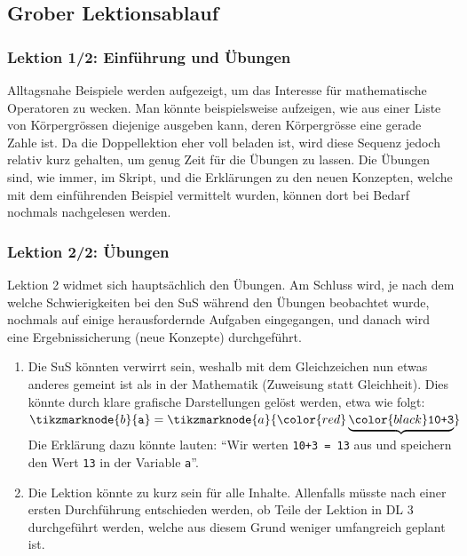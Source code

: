 \begin{myExBox}[title=DL \themycounter]
\subsection*{Grober Lektionsablauf}
\subsubsection*{Lektion 1/2: Einführung und Übungen}
Alltagsnahe Beispiele werden aufgezeigt, um das Interesse für mathematische Operatoren zu wecken. Man könnte beispielsweise aufzeigen, wie aus einer Liste von Körpergrössen diejenige ausgeben kann, deren Körpergrösse eine gerade Zahle ist. Da die Doppellektion eher voll beladen ist, wird diese Sequenz jedoch relativ kurz gehalten, um genug Zeit für die Übungen zu lassen. Die Übungen sind, wie immer, im Skript, und die Erklärungen zu den neuen Konzepten, welche mit dem einführenden Beispiel vermittelt wurden, können dort bei Bedarf nochmals nachgelesen werden.

\subsubsection*{Lektion 2/2: Übungen}
Lektion 2 widmet sich hauptsächlich den Übungen. Am Schluss wird, je nach dem welche Schwierigkeiten bei den SuS während den Übungen beobachtet wurde, nochmals auf einige herausfordernde Aufgaben eingegangen, und danach wird eine Ergebnissicherung (neue Konzepte) durchgeführt.

\begin{myExBox}[title=Mögliche Schwierigkeiten \& geeignete Massnahmen]
\begin{enumerate}
    \item Die SuS könnten verwirrt sein, weshalb mit dem Gleichzeichen nun etwas anderes gemeint ist als in der Mathematik (Zuweisung statt Gleichheit). Dies könnte durch klare grafische Darstellungen gelöst werden, etwa wie folgt: $  \tikzmarknode{b}{\text{\texttt{a}}} =\tikzmarknode{a}{\color{red}\underbrace{\color{black}\text{\texttt{10+3}}}}
        $
	Die Erklärung dazu könnte lauten: \enquote{Wir werten \lstinline|10+3 = 13| aus und speichern den Wert \lstinline|13| in der Variable \lstinline|a|}.
	\item Die Lektion könnte zu kurz sein für alle Inhalte. Allenfalls müsste nach einer ersten Durchführung entschieden werden, ob Teile der Lektion in DL 3 durchgeführt werden, welche aus diesem Grund weniger umfangreich geplant ist.
\end{enumerate}
\end{myExBox}
\end{myExBox}
\newpage{}

